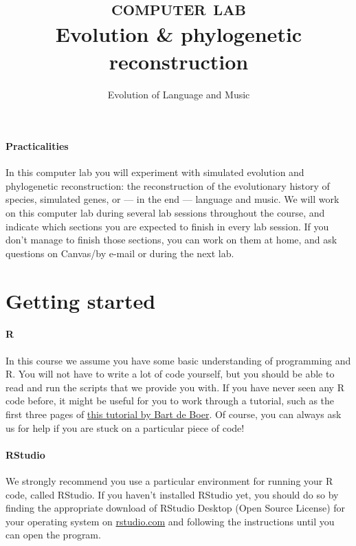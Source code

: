 \documentclass[a4paper, 9pt]{article}
\title{\textsc{computer lab}\\ \textbf{Evolution \& phylogenetic reconstruction}}
\author{Evolution of Language and Music}
\date{}
\begin{document}
\maketitle
{}

\paragraph{Practicalities}
In this computer lab you will experiment with simulated evolution and phylogenetic reconstruction: the reconstruction of the evolutionary history of species, simulated genes, or --- in the end --- language and music. 
We will work on this computer lab during several lab sessions throughout the course, and indicate which sections you are expected to finish in every lab session.
If you don't manage to finish those sections, you can work on them at home, and ask questions on Canvas/by e-mail or during the next lab.

\section{Getting started}

\paragraph{R} 
In this course we assume you have some basic understanding of programming and R. You will not have to write a lot of code yourself, but you should be able to read and run the scripts that we provide you with. If you have never seen any R code before, it might be useful for you to work through a tutorial, such as the first three pages of \href{http://projects.illc.uva.nl/LaCo/CLAS/clc13/assignments/deboer13rtutorial.pdf}{this tutorial by Bart de Boer}.
Of course, you can always ask us for help if you are stuck on a particular piece of code!

\paragraph{RStudio}
We strongly recommend you use a particular environment for running your R code, called RStudio. If you haven't installed RStudio yet, you should do so by finding the appropriate download of RStudio Desktop (Open Source License) for your operating system on \href{https://rstudio.com}{rstudio.com} and following the instructions until you can open the program.
\end{document}
